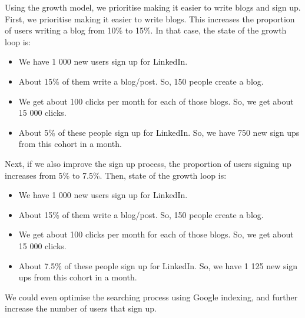 \documentclass[a4paper, openany]{memoir}
\begin{document}
Using the growth model, we prioritise making it easier to write blogs and sign up. First, we prioritise making it easier to write blogs. This increases the proportion of users writing a blog from 10\% to 15\%. In that case, the state of the growth loop is:
\begin{itemize}
    \item We have 1 000 new users sign up for LinkedIn.
    \item About 15\% of them write a blog/post. So, 150 people create a blog.
    \item We get about 100 clicks per month for each of those blogs. So, we get about 15 000 clicks.
    \item About 5\% of these people sign up for LinkedIn. So, we have 750 new sign ups from this cohort in a month.
\end{itemize}
Next, if we also improve the sign up process, the proportion of users signing up increases from 5\% to 7.5\%. Then, state of the growth loop is:
\begin{itemize}
    \item We have 1 000 new users sign up for LinkedIn.
    \item About 15\% of them write a blog/post. So, 150 people create a blog.
    \item We get about 100 clicks per month for each of those blogs. So, we get about 15 000 clicks.
    \item About 7.5\% of these people sign up for LinkedIn. So, we have 1 125 new sign ups from this cohort in a month.
\end{itemize}
We could even optimise the searching process using Google indexing, and further increase the number of users that sign up.
\end{document}
